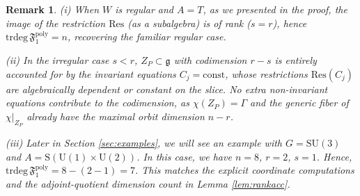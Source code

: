 \documentclass[11pt]{amsart}
\theoremstyle{definition}
\theoremstyle{plain}
\newtheorem{remark}[theorem]{Remark}
\theoremstyle{conclusion}
\begin{document}
\begin{remark}
    (i) When $W$ is regular and $A=T$, as we presented in the proof, the image of the restriction $\mathrm{Res}$ (as a subalgebra) is of rank ($s=r$), hence $\mathrm{trdeg} \,\mathfrak{F}_1^{\mathrm{poly}}=n$, recovering the familiar regular case.

(ii) In the irregular case $s<r$, $Z_P \subset \mathfrak{g}$ with codimension $r-s$ is entirely accounted for by the invariant equations $C_j=\text{const}$, whose restrictions $\mathrm{Res}(C_j)$ are algebraically dependent or constant on the slice. No extra non-invariant equations contribute to the codimension, as $\chi(Z_P)=\Gamma$ and the generic fiber of $\chi\vert_{Z_P}$ already have the maximal orbit dimension $n-r$.

(iii) Later in Section \ref{sec:examples}, we will see an example with $G=\mathrm{SU}(3)$ and $A=\mathrm{S}(\mathrm{U}(1)\times \mathrm{U}(2))$. In this case, we have $n=8$, $r=2$, $s=1$. Hence, $\mathrm{trdeg}\,\mathfrak{F}_1^{\mathrm{poly}}=8-(2-1)=7$. This matches the explicit coordinate computations and the adjoint-quotient dimension count in Lemma \ref{lem:rankacc}.
\end{remark}
\end{document}

